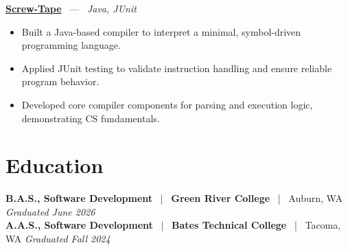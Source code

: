 \documentclass[10pt, letterpaper]{article}
\newcommand{\jobhead}[4]{%
  \vspace{5pt}%
  {\bfseries\color{dark}#1}%
  ~{\color{light}|}~%
  {\bfseries\color{navy}#2}%
  ~{\color{light}|}~%
  {\color{light}#3}%
  \hfill{\color{light}\small\textit{#4}}\\[-2pt]%
}
\newcommand{\projhead}[3]{%
  \vspace{5pt}%
  {\bfseries\color{dark}\href{#2}{#1}}%
  ~{\color{light}---}~%
  {\color{light}\small\textit{#3}}\\[-2pt]%
}
\begin{document}
\projhead{Screw-Tape}{https://github.com/timmyd4/screwtape}{Java, JUnit}
\begin{itemize}
  \item Built a Java-based compiler to interpret a minimal, symbol-driven programming language.
  \item Applied JUnit testing to validate instruction handling and ensure reliable program behavior.
  \item Developed core compiler components for parsing and execution logic, demonstrating CS fundamentals.
\end{itemize}

\section{Education}

\jobhead{B.A.S., Software Development}{Green River College}{Auburn, WA}{Graduated June 2026}
\jobhead{A.A.S., Software Development}{Bates Technical College}{Tacoma, WA}{Graduated Fall 2024}
\end{document}
